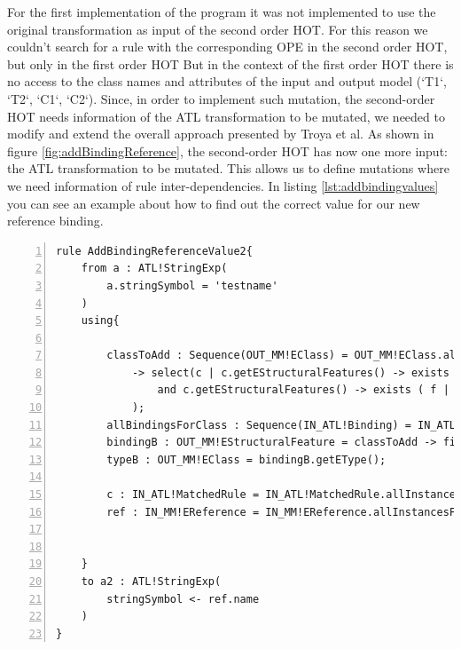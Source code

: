 \documentclass{llncs}
\begin{document}
For the first implementation of the program it was not implemented to use the original transformation as input of 
the second order HOT.
For this reason we couldn't search for a rule with the corresponding OPE in the second order HOT, but only in the first order HOT
But in the context of the first order HOT there is no access to the class names and attributes of the
input and output model (`T1`, `T2`, `C1`, `C2`). 
Since, in order to implement such mutation, the second-order HOT needs information of the ATL transformation to be mutated, we needed to modify and extend the overall approach presented by Troya et al. As shown in figure \ref{fig:addBindingReference}, the second-order HOT has now one more input: the ATL transformation to be mutated. This allows us to define mutations where we need information of rule inter-dependencies.
In listing \ref{lst:addbindingvalues} you can see an example about how to find out the correct value for our new reference binding.

\begin{lstlisting}[language=ATL, numbers=left,xleftmargin=5.0ex, caption=AddBindingValue-Definition., label=lst:addbindingvalues]
rule AddBindingReferenceValue2{
	from a : ATL!StringExp(
		a.stringSymbol = 'testname'
	)
	using{
		
		classToAdd : Sequence(OUT_MM!EClass) = OUT_MM!EClass.allInstancesFrom('OUT_MM') 
			-> select(c | c.getEStructuralFeatures() -> exists ( f | f.oclIsTypeOf(OUT_MM!EReference))
				and c.getEStructuralFeatures() -> exists ( f | allBindingsForClass -> forAll( b | b.propertyName.debug('bindingname') <> f.name.debug('f.name')).debug('forall'))
			);
		allBindingsForClass : Sequence(IN_ATL!Binding) = IN_ATL!Binding.allInstancesFrom('IN_ATL').debug('bindings');
		bindingB : OUT_MM!EStructuralFeature = classToAdd -> first().getEStructuralFeatures() -> select (f | allBindingsForClass -> forAll(b | b.propertyName <> f.name)) -> first();
		typeB : OUT_MM!EClass = bindingB.getEType();

		c : IN_ATL!MatchedRule = IN_ATL!MatchedRule.allInstancesFrom('IN_ATL') -> select(r | r.outPattern.elements -> first().type.name = typeB.name) -> first().debug();
		ref : IN_MM!EReference = IN_MM!EReference.allInstancesFrom('IN_MM') -> select(r | r.eReferenceType.name = c.inPattern.elements -> first().type.name) -> first().debug();
		
		
	}
	to a2 : ATL!StringExp(
		stringSymbol <- ref.name
	)
}
\end{lstlisting}
\end{document}
